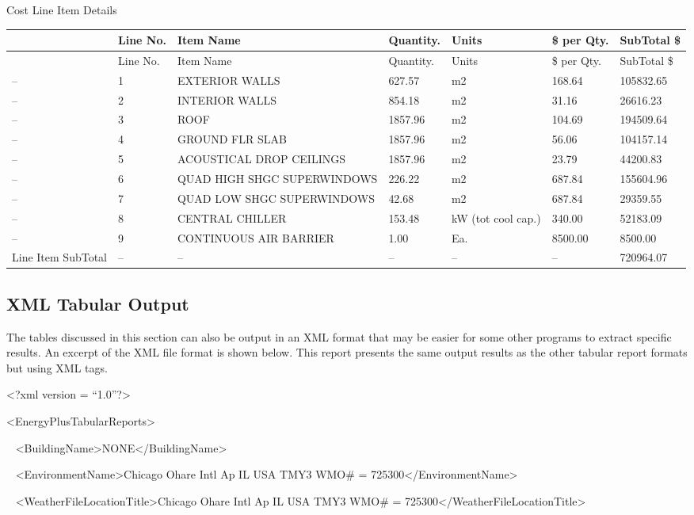 Cost Line Item Details

\begin{longtable}[c]{>{\raggedright}p{0.85in}>{\raggedright}p{0.85in}>{\raggedright}p{0.85in}>{\raggedright}p{0.85in}>{\raggedright}p{0.85in}>{\raggedright}p{0.85in}>{\raggedright}p{0.85in}}
\toprule
~ & Line No. & Item Name & Quantity. & Units & \$ per Qty. & SubTotal \$ \tabularnewline
\midrule
\endfirsthead

\toprule
~ & Line No. & Item Name & Quantity. & Units & \$ per Qty. & SubTotal \$ \tabularnewline
\midrule
\endhead

-- & 1 & EXTERIOR WALLS & 627.57 & m2 & 168.64 & 105832.65 \tabularnewline
-- & 2 & INTERIOR WALLS & 854.18 & m2 & 31.16 & 26616.23 \tabularnewline
-- & 3 & ROOF & 1857.96 & m2 & 104.69 & 194509.64 \tabularnewline
-- & 4 & GROUND FLR SLAB & 1857.96 & m2 & 56.06 & 104157.14 \tabularnewline
-- & 5 & ACOUSTICAL DROP CEILINGS & 1857.96 & m2 & 23.79 & 44200.83 \tabularnewline
-- & 6 & QUAD HIGH SHGC SUPERWINDOWS & 226.22 & m2 & 687.84 & 155604.96 \tabularnewline
-- & 7 & QUAD LOW SHGC SUPERWINDOWS & 42.68 & m2 & 687.84 & 29359.55 \tabularnewline
-- & 8 & CENTRAL CHILLER & 153.48 & kW (tot cool cap.) & 340.00 & 52183.09 \tabularnewline
-- & 9 & CONTINUOUS AIR BARRIER & 1.00 & Ea. & 8500.00 & 8500.00 \tabularnewline
Line Item SubTotal & -- & -- & -- & -- & -- & 720964.07 \tabularnewline
\bottomrule
\end{longtable}

\subsection{XML Tabular Output}\label{xml-tabular-output}

The tables discussed in this section can also be output in an XML format that may be easier for some other programs to extract specific results. An excerpt of the XML file format is shown below. This report presents the same output results as the other tabular report formats but using XML tags.

\textless{}?xml version = ``1.0''?\textgreater{}

\textless{}EnergyPlusTabularReports\textgreater{}

~ \textless{}BuildingName\textgreater{}NONE\textless{}/BuildingName\textgreater{}

~ \textless{}EnvironmentName\textgreater{}Chicago Ohare Intl Ap IL USA TMY3 WMO\# = 725300\textless{}/EnvironmentName\textgreater{}

~ \textless{}WeatherFileLocationTitle\textgreater{}Chicago Ohare Intl Ap IL USA TMY3 WMO\# = 725300\textless{}/WeatherFileLocationTitle\textgreater{}

